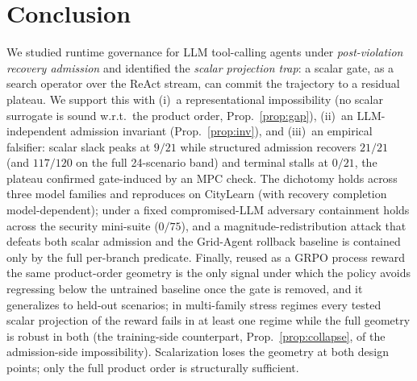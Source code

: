 \section{Conclusion}
\label{sec:conclusion}

We studied runtime governance for LLM tool-calling agents under \emph{post-violation recovery admission} and identified the \emph{scalar projection trap}: a scalar gate, as a search operator over the ReAct stream, can commit the trajectory to a residual plateau. We support this with (i)~a representational impossibility (no scalar surrogate is sound w.r.t.\ the product order, Prop.~\ref{prop:gap}), (ii)~an LLM-independent admission invariant (Prop.~\ref{prop:inv}), and (iii)~an empirical falsifier: scalar slack peaks at $9/21$ while structured admission recovers $21/21$ (and $117/120$ on the full 24-scenario band) and terminal stalls at $0/21$, the plateau confirmed gate-induced by an MPC check. The dichotomy holds across three model families and reproduces on CityLearn (with recovery completion model-dependent); under a fixed compromised-LLM adversary containment holds across the security mini-suite ($0/75$), and a magnitude-redistribution attack that defeats both scalar admission and the Grid-Agent rollback baseline is contained only by the full per-branch predicate. Finally, reused as a GRPO process reward the same product-order geometry is the only signal under which the policy avoids regressing below the untrained baseline once the gate is removed, and it generalizes to held-out scenarios; in multi-family stress regimes every tested scalar projection of the reward fails in at least one regime while the full geometry is robust in both (the training-side counterpart, Prop.~\ref{prop:collapse}, of the admission-side impossibility). Scalarization loses the geometry at both design points; only the full product order is structurally sufficient.
